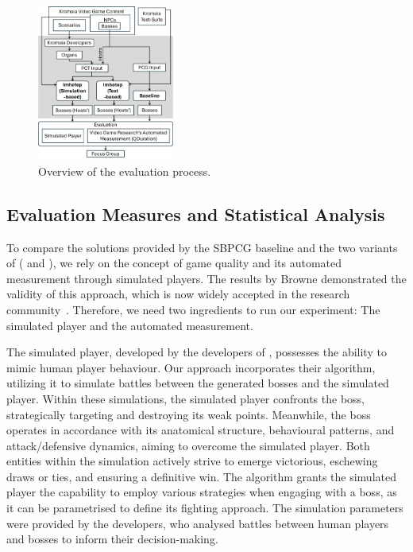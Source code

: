 \begin{figure}[ht]
    \centering
    \includegraphics[width=0.4\textwidth]{Figures/evaluation_process.png}
    \caption{Overview of the evaluation process.}
    \label{fig:evaluation}
\end{figure}

\subsection{Evaluation Measures and Statistical Analysis}
To compare the solutions provided by the SBPCG baseline and the two variants of \ApproachName{} (\simhotep{} and \timhotep{}), we rely on the concept of game quality and its automated measurement through simulated players. The results by Browne \etal demonstrated the validity of this approach, which is now widely accepted in the research community~\cite{browne2010evolutionary}. Therefore, we need two ingredients to run our experiment: The simulated player and the automated measurement.

The simulated player, developed by the developers of  \CaseStudy{}, possesses the ability to mimic human player behaviour. Our approach incorporates their algorithm, utilizing it to simulate battles between the generated bosses and the simulated player. Within these simulations, the simulated player confronts the boss, strategically targeting and destroying its weak points. Meanwhile, the boss operates in accordance with its anatomical structure, behavioural patterns, and attack/defensive dynamics, aiming to overcome the simulated player. Both entities within the simulation actively strive to emerge victorious, eschewing draws or ties, and ensuring a definitive win. The algorithm grants the simulated player the capability to employ various strategies when engaging with a boss, as it can be parametrised to define its fighting approach. The simulation parameters were provided by the developers, who analysed battles between human players and bosses to inform their decision-making.

